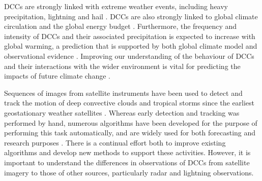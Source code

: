 \documentclass[amt, manuscript]{copernicus}
\begin{document}
DCCs are strongly linked with extreme weather events, including heavy precipitation, lightning and hail \citep{westra_future_2014, houze_chapter_2014, williams_radar_1992, bruning_theory_2013, punge_hail_2016, matsudo_severe_2011}. 
DCCs are also strongly linked to global climate circulation and the global energy budget \citep{houze_mesoscale_2004, fritsch_mesoscale_2001, johnson_mesoscale_2001}.
Furthermore, the frequency and intensity of DCCs and their associated precipitation is expected to increase with global warming, a prediction that is supported by both global climate model \citep{allen_constraints_2002, trenberth_changing_2003, held_robust_2006, muller_energetic_2011, ogorman_energetic_2012, ogorman_precipitation_2015} and observational evidence \citep{tan_increases_2015, berg_strong_2013, aumann_increased_2018, houze_extreme_2019}.
Improving our understanding of the behaviour of DCCs and their interactions with the wider environment is vital for predicting the impacts of future climate change \citep{westra_future_2014}.

Sequences of images from satellite instruments have been used to detect and track the motion of deep convective clouds and tropical storms since the earliest geostationary weather satellites \citep{menzel_cloud_2001}.
Whereas early detection and tracking was performed by hand, numerous algorithms have been developed for the purpose of performing this task automatically, and are widely used for both forecasting and research purposes \citep[e.g.][]{mecikalski_use_2011, senf_characterization_2015, senf_satellite-based_2017, feng_life_2012, feng_spatiotemporal_2019, zinner_cb-tram:_2008}.
There is a continual effort both to improve existing algorithms and develop new methods to support these activities.
However, it is important to understand the differences in observations of DCCs from satellite imagery to those of other sources, particularly radar and lightning observations.
\end{document}
